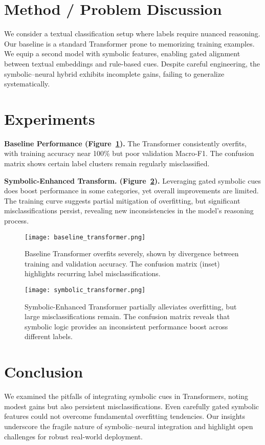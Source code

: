 \documentclass{article}
\begin{document}
\section{Method / Problem Discussion}
We consider a textual classification setup where labels require nuanced reasoning. Our baseline is a standard Transformer prone to memorizing training examples. We equip a second model with symbolic features, enabling gated alignment between textual embeddings and rule-based cues. Despite careful engineering, the symbolic–neural hybrid exhibits incomplete gains, failing to generalize systematically.

\section{Experiments}
\textbf{Baseline Performance (Figure~\ref{fig:baseline}).} The Transformer consistently overfits, with training accuracy near 100\% but poor validation Macro-F1. The confusion matrix shows certain label clusters remain regularly misclassified.

\textbf{Symbolic-Enhanced Transform. (Figure~\ref{fig:symbolic}).} Leveraging gated symbolic cues does boost performance in some categories, yet overall improvements are limited. The training curve suggests partial mitigation of overfitting, but significant misclassifications persist, revealing new inconsistencies in the model's reasoning process.

\begin{figure}[t!]
\centering
\texttt{[image: baseline\_transformer.png]}
\caption{Baseline Transformer overfits severely, shown by divergence between training and validation accuracy. The confusion matrix (inset) highlights recurring label misclassifications.}
\label{fig:baseline}
\end{figure}

\begin{figure}[t!]
\centering
\texttt{[image: symbolic\_transformer.png]}
\caption{Symbolic-Enhanced Transformer partially alleviates overfitting, but large misclassifications remain. The confusion matrix reveals that symbolic logic provides an inconsistent performance boost across different labels.}
\label{fig:symbolic}
\end{figure}

\section{Conclusion}
We examined the pitfalls of integrating symbolic cues in Transformers, noting modest gains but also persistent misclassifications. Even carefully gated symbolic features could not overcome fundamental overfitting tendencies. Our insights underscore the fragile nature of symbolic–neural integration and highlight open challenges for robust real-world deployment.
\end{document}
